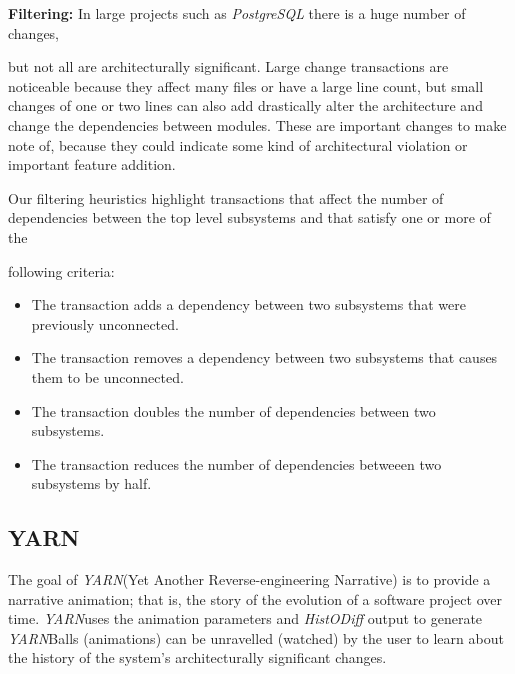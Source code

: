 \documentclass[times, 10pt,twocolumn]{article}
\newcommand{\yarn}{\emph{YARN\xspace}}
\newcommand{\postgresql}{\emph{PostgreSQL}\xspace}
\newcommand{\Subsection}[1]{\subsection{#1}}
\begin{document}
\textbf{Filtering:} In large projects such as \postgresql there is
a huge number of changes,



but not all are architecturally
significant.  Large change transactions are 
noticeable because they
affect many files or have a large line count, but small changes of one or
two lines can also add drastically alter the architecture and change the
dependencies between modules.  These are important changes to make note of,
because they could indicate some kind of architectural violation or
important feature addition.

Our filtering heuristics highlight transactions that affect the number of
dependencies between the top level subsystems and that 
satisfy one or more of the



following criteria:

\begin{itemize}
\item The transaction adds a dependency between two subsystems that were 
    previously unconnected.
\item The transaction removes a dependency between two subsystems that
    causes them to be unconnected.
\item The transaction doubles the number of dependencies between two subsystems.
\item The transaction reduces the number of dependencies betweeen two
    subsystems by half.
\end{itemize}



\Subsection{YARN}






The goal of \yarn (Yet Another Reverse-engineering Narrative) is to provide
a narrative animation; that is, the story of the evolution of a software
project over time.  \yarn uses the animation parameters and
\emph{HistODiff} output to generate \yarn Balls (animations) can be
unravelled (watched) by the user to learn about the history of the system's
architecturally significant changes.
\end{document}
